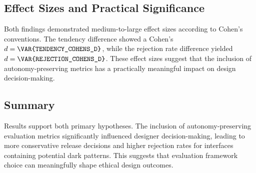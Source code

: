 \subsection{Effect Sizes and Practical Significance}
Both findings demonstrated medium-to-large effect sizes according to Cohen's conventions. The tendency difference showed a Cohen's $d = \texttt{\VAR{TENDENCY\_COHENS\_D}}$, while the rejection rate difference yielded $d = \texttt{\VAR{REJECTION\_COHENS\_D}}$. These effect sizes suggest that the inclusion of autonomy-preserving metrics has a practically meaningful impact on design decision-making.

\subsection{Summary}
Results support both primary hypotheses. The inclusion of autonomy-preserving evaluation metrics significantly influenced designer decision-making, leading to more conservative release decisions and higher rejection rates for interfaces containing potential dark patterns. This suggests that evaluation framework choice can meaningfully shape ethical design outcomes.

